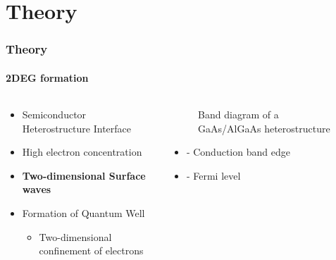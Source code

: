 \documentclass[mathserif,18pt,xcolor=table]{beamer}
\begin{document}
\section{Theory}
\begin{frame}
  \frametitle{Theory}
  \framesubtitle{2DEG formation}
  \begin{columns} %
    \begin{column}{.5\textwidth}
      \begin{minipage}[T][.1\textheight][c]{\linewidth}
        \begin{itemize}
          \item Semiconductor Heterostructure Interface
          \item High electron concentration
          \item \textbf{Two-dimensional Surface waves}
          \item Formation of Quantum Well
          \begin{itemize}
            \item[]{Two-dimensional confinement of electrons}
          \end{itemize}
        \end{itemize}
      \end{minipage}
    \end{column}
    \begin{column}{.5\textwidth}
      \begin{figure}
        \vspace*{-1cm}
        \def\svgwidth{\linewidth}
        
        \caption{Band diagram of a GaAs/AlGaAs heterostructure}
      \end{figure}
      \begin{itemize}
        \item[]{ - Conduction band edge}
        \item[]{ - Fermi level}
      \end{itemize}
      \end{column}%
    \end{columns}
  \end{frame}
\end{document}
